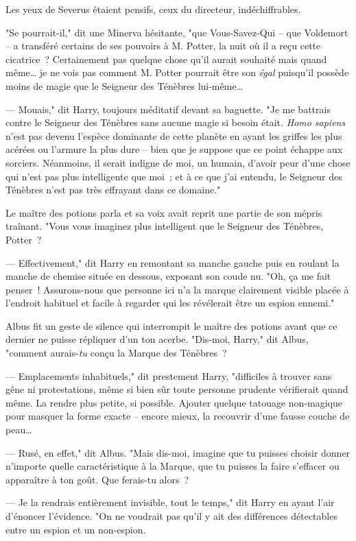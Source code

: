 Les yeux de Severus étaient pensifs, ceux du directeur, indéchiffrables.

"Se pourrait-il," dit une Minerva hésitante, "que Vous-Savez-Qui -- que Voldemort -- a transféré certains de ses pouvoirs à M. Potter, la nuit où il a reçu cette cicatrice~? Certainement pas quelque chose qu'il aurait souhaité mais quand même… je ne vois pas comment M. Potter pourrait être son \emph{égal} puisqu'il possède moins de magie que le Seigneur des Ténèbres lui-même…

--- Mouais," dit Harry, toujours méditatif devant sa baguette. "Je me battrais contre le Seigneur des Ténèbres sans aucune magie si besoin était. \emph{Homo sapiens} n'est pas devenu l'espèce dominante de cette planète en ayant les griffes les plus acérées ou l'armure la plus dure -- bien que je suppose que ce point échappe aux sorciers. Néanmoins, il serait indigne de moi, un humain, d'avoir peur d'une chose qui n'est pas plus intelligente que moi~; et à ce que j'ai entendu, le Seigneur des Ténèbres n'est pas très effrayant dans ce domaine."

Le maître des potions parla et sa voix avait reprit une partie de son mépris traînant. "Vous vous imaginez plus intelligent que le Seigneur des Ténèbres, Potter~?

--- Effectivement," dit Harry en remontant sa manche gauche puis en roulant la manche de chemise située en dessous, exposant son coude nu. "Oh, ça me fait penser~! Assurons-nous que personne ici n'a la marque clairement visible placée à l'endroit habituel et facile à regarder qui les révélerait être un espion ennemi."

Albus fit un geste de silence qui interrompit le maître des potions avant que ce dernier ne puisse répliquer d'un ton acerbe. "Dis-moi, Harry," dit Albus, "comment aurais-\emph{tu} conçu la Marque des Ténèbres~?

--- Emplacements inhabituels," dit prestement Harry, "difficiles à trouver sans gêne ni protestations, même si bien sûr toute personne prudente vérifierait quand même. La rendre plus petite, si possible. Ajouter quelque tatouage non-magique pour masquer la forme exacte -- encore mieux, la recouvrir d'une fausse couche de peau…

--- Rusé, en effet," dit Albus. "Mais dis-moi, imagine que tu puisses choisir donner n'importe quelle caractéristique à la Marque, que tu puisses la faire s'effacer ou apparaître à ton goût. Que ferais-tu alors~?

--- Je la rendrais entièrement invisible, tout le temps," dit Harry en ayant l'air d'énoncer l'évidence. "On ne voudrait pas qu'il y ait des différences détectables entre un espion et un non-espion.

